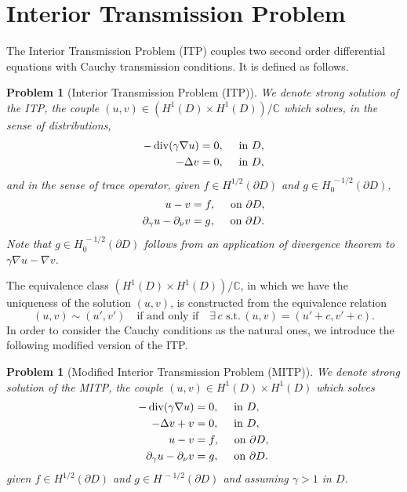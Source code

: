 \documentclass[10pt, a4paper, twoside, openright]{book}
\theoremstyle{definition}
\theoremstyle{plain}
\theoremstyle{plain}
\theoremstyle{plain}
\theoremstyle{plain}
\theoremstyle{plain}
\theoremstyle{plain}
\theoremstyle{plain}
\theoremstyle{plain}
\newtheorem{problem}[subsection]{Problem}
\DeclareMathOperator{\divergence}{div}
\begin{document}
\section{Interior Transmission Problem}
The Interior Transmission Problem (ITP) couples two second order differential equations with Cauchy transmission conditions.
It is defined as follows.
\begin{problem}[Interior Transmission Problem (ITP)]
\label{problem:ITP-dist}
We denote \emph{strong solution} of the ITP, the couple {$(u,v) \in (H^1(D) \times H^1(D))/\mathbb{C}$} which solves, in the sense of distributions,
\begin{align}
-\divergence(\gamma\nabla u) & = 0,\quad\textup{ in }D, \\
-\Delta v & = 0, \quad\textup{ in }D,
\end{align}
and in the sense of trace operator, given $f\in H^{1/2}(\partial D)$ and $g\in H^{\,-1/2}_0(\partial D)$,
\begin{align}
  u - v & = f, \quad\textup{ on }\partial D,\\
  \partial_\gamma u - \partial_\nu v & = g, \quad\textup{ on }\partial D.
\end{align}
Note that $g\in H^{\,-1/2}_0(\partial D)$ follows from an application of divergence theorem to $\gamma\nabla u - \nabla v$.
\end{problem}
The equivalence class $(H^1(D) \times H^1(D))/\mathbb{C}$, in which we have the uniqueness of the solution $(u,v)$, is constructed from the equivalence relation
\begin{equation}
 (u,v)\sim(u',v') \quad \text{if and only if} \quad \exists \,c \,\,\text{s.t.}\,(u,v) = (u' + c,v' + c).
\end{equation}
In order to consider the Cauchy conditions as the natural ones, we introduce the following modified version of the ITP.
\begin{problem}[Modified Interior Transmission Problem (MITP)]
\label{problem:MITP-dist}
We denote \emph{strong solution} of the MITP, the couple {$(u,v) \in H^1(D) \times H^1(D)$} which solves
\begin{align}
-\divergence(\gamma\nabla u) & = 0,\quad\textup{ in }D, \\
-\Delta v + v & = 0, \quad\textup{ in }D, \\
  u - v & = f, \quad\textup{ on }\partial D,\\
  \partial_\gamma u - \partial_\nu v & = g, \quad\textup{ on }\partial D.
\end{align}
given $f\in H^{1/2}(\partial D)$ and $g\in H^{\,-1/2}(\partial D)$ and assuming $\gamma>1$ in $D$.
\end{problem}
\end{document}
